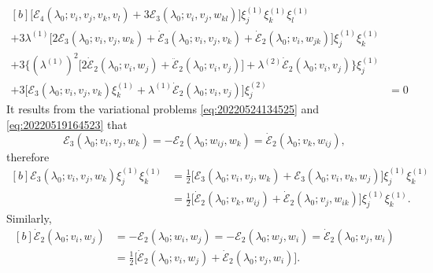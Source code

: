 \documentclass[12pt, final]{scrartcl}
\theoremstyle{definition}
\newcommand{\E}{\mathcal E}
\newcommand{\order}[2][1]{#2^{(#1)}}
\begin{document}
\begin{equation*}
  \begin{aligned}[b]
    \bigl[\E_4(\lambda_0; v_i, v_j, v_k, v_l) + 3\E_3(\lambda_0; v_i, v_j, w_{kl})\bigr] \order[1]{\xi_j} \order[1]{\xi_k} \order[1]{\xi_l}&\\
    + 3\order[1]\lambda \bigl[2\E_3(\lambda_0; v_i, v_j, w_k) + \dot{\E}_3(\lambda_0; v_i, v_j, v_k) + \dot{\E}_2(\lambda_0; v_i, w_{jk}) \bigr] \order[1]{\xi_j} \order[1]{\xi_k}&\\
    + 3 \bigl\{ ( \order[1]\lambda )^2 \bigl[ 2 \dot{\E}_2(\lambda_0; v_i, w_j) + \ddot{\E}_2(\lambda_0; v_i, v_j) \bigr] + \order[2]\lambda \dot{\E}_2(\lambda_0; v_i, v_j) \bigr\}\order[1]{\xi_j}&\\
    + 3\bigl[\E_3(\lambda_0; v_i, v_j, v_k) \order[1]{\xi_k} + \order[1]\lambda \dot{\E}_2(\lambda_0; v_i, v_j)\bigr] \order[2]{\xi_j} &= 0
  \end{aligned}
\end{equation*}
It results from the variational problems \eqref{eq:20220524134525} and
\eqref{eq:20220519164523} that
\begin{equation*}
  \E_3(\lambda_0; v_i, v_j, w_k) = -\E_2(\lambda_0 ; w_{ij}, w_k) = \dot{\E}_2(\lambda_0; v_k, w_{ij}),
\end{equation*}
therefore
\begin{equation*}
  \begin{aligned}[b]
    \E_3(\lambda_0; v_i, v_j, w_k) \order[1]{\xi_j} \order[1]{\xi_k} &= \tfrac{1}{2} \bigl[ \E_3(\lambda_0; v_i, v_j, w_k) + \E_3(\lambda_0; v_i, v_k, w_j)\bigr] \order[1]{\xi_j} \order[1]{\xi_k}\\
                                    &= \tfrac{1}{2} \bigl[ \dot{\E}_2(\lambda_0; v_k, w_{ij}) + \dot{\E}_2(\lambda_0; v_j, w_{ik}) \bigr] \order[1]{\xi_j} \order[1]{\xi_k}.
  \end{aligned}
\end{equation*}
Similarly,
\begin{equation*}
  \begin{aligned}[b]
    \dot{\E}_2(\lambda_0; v_i, w_j) &= -\E_2(\lambda_0; w_i, w_j) = -\E_2(\lambda_0; w_j, w_i) = \dot{\E}_2(\lambda_0; v_j, w_i)\\
                           &= \tfrac{1}{2} \bigl[ \dot{\E}_2(\lambda_0; v_i, w_j) + \dot{\E}_2(\lambda_0; v_j, w_i) \bigr].
  \end{aligned}
\end{equation*}
\end{document}
